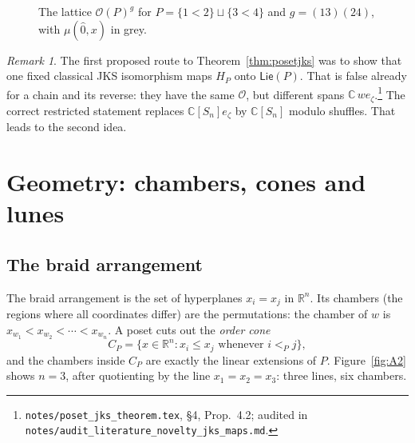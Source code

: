 \documentclass[11pt]{article}
\theoremstyle{definition}
\theoremstyle{remark}
\newtheorem*{remark}{Remark}
\newcommand{\OP}{\mathcal O}
\newcommand{\PLie}{\mathsf{Lie}}
\newcommand{\src}[1]{\nolinkurl{#1}}
\newcommand{\tagbox}[1]{\leavevmode\marginpar{\raggedright\fbox{\parbox{0.66in}{\centering\scriptsize\sffamily #1}}}}
\newcommand{\PROVEN}{\tagbox{PROVEN\\AUDITED}}
\begin{document}
\begin{figure}[ht]
\centering
{}
\caption{The lattice $\OP(P)^g$ for $P=\{1<2\}\sqcup\{3<4\}$ and $g=(13)(24)$,
with $\mu(\hat0,x)$ in grey.}\label{fig:fixed}
\end{figure}

\begin{remark}
The first proposed route to Theorem~\ref{thm:posetjks} was to show that one
fixed classical JKS isomorphism maps $H_P$ onto $\PLie(P)$. That is false
already for a chain and its reverse: they have the same $\OP$, but different
spans $\mathbb C\,we_\zeta$.\footnote{\src{notes/poset_jks_theorem.tex}, \S4,
Prop.~4.2; audited in \src{notes/audit_literature_novelty_jks_maps.md}.}%
\PROVEN{} The correct restricted statement replaces $\mathbb C[S_n]e_\zeta$
by $\mathbb C[S_n]$ modulo shuffles. That leads to the second idea.
\end{remark}

\section{Geometry: chambers, cones and lunes}

\subsection{The braid arrangement}

The braid arrangement is the set of hyperplanes $x_i=x_j$ in $\mathbb R^n$.
Its chambers (the regions where all coordinates differ) are the
permutations: the chamber of $w$ is $x_{w_1}<x_{w_2}<\cdots<x_{w_n}$. A poset
cuts out the \emph{order cone}
\[
C_P=\{x\in\mathbb R^n: x_i\le x_j\text{ whenever }i<_Pj\},
\]
and the chambers inside $C_P$ are exactly the linear extensions of $P$.
Figure~\ref{fig:A2} shows $n=3$, after quotienting by the line
$x_1=x_2=x_3$: three lines, six chambers.
\end{document}
